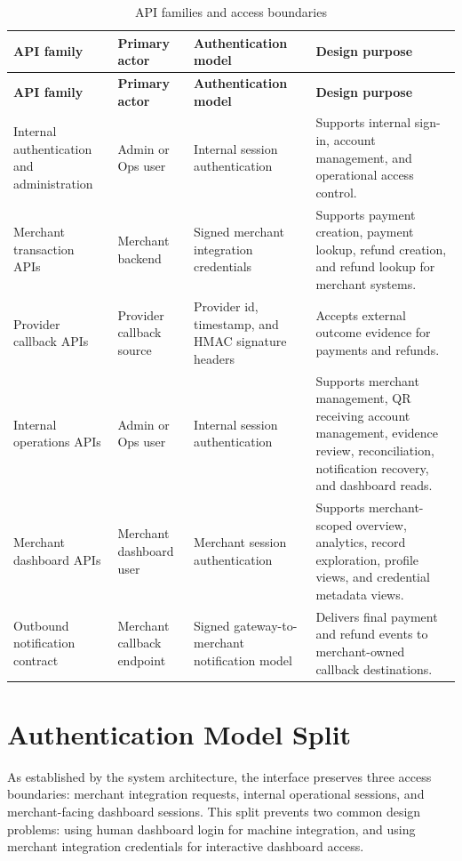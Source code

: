 \begin{longtable}{L{0.17\textwidth}L{0.19\textwidth}L{0.20\textwidth}L{0.34\textwidth}}
\caption{API families and access boundaries}\\
\toprule
\textbf{API family} & \textbf{Primary actor} & \textbf{Authentication model} & \textbf{Design purpose} \\
\midrule
\endfirsthead
\toprule
\textbf{API family} & \textbf{Primary actor} & \textbf{Authentication model} & \textbf{Design purpose} \\
\midrule
\endhead
Internal authentication and administration & Admin or Ops user & Internal session authentication & Supports internal sign-in, account management, and operational access control. \\
\bodyrowrule
Merchant transaction APIs & Merchant backend & Signed merchant integration credentials & Supports payment creation, payment lookup, refund creation, and refund lookup for merchant systems. \\
\bodyrowrule
Provider callback APIs & Provider callback source & Provider id, timestamp, and HMAC signature headers & Accepts external outcome evidence for payments and refunds. \\
\bodyrowrule
Internal operations APIs & Admin or Ops user & Internal session authentication & Supports merchant management, QR receiving account management, evidence review, reconciliation, notification recovery, and dashboard reads. \\
\bodyrowrule
Merchant dashboard APIs & Merchant dashboard user & Merchant session authentication & Supports merchant-scoped overview, analytics, record exploration, profile views, and credential metadata views. \\
\bodyrowrule
Outbound notification contract & Merchant callback endpoint & Signed gateway-to-merchant notification model & Delivers final payment and refund events to merchant-owned callback destinations. \\
\bottomrule
\end{longtable}

\section{Authentication Model Split}

As established by the system architecture, the interface preserves three access
boundaries: merchant integration requests, internal operational sessions, and
merchant-facing dashboard sessions. This split prevents two common design
problems: using human dashboard login for machine integration, and using
merchant integration credentials for interactive dashboard access.

